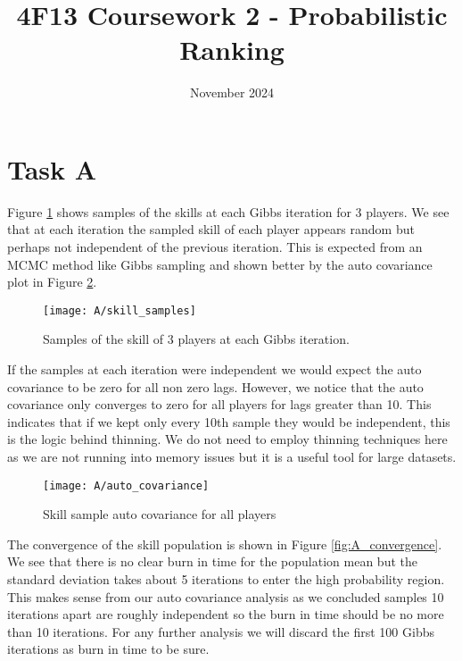 \documentclass[11pt]{article}
\title{\vspace{-2cm}4F13 Coursework 2 - Probabilistic Ranking}
\author{}
\date{November 2024}
\begin{document}


\setcounter{page}{1}

\maketitle

\section{Task A}

Figure \ref{fig:A_skill_samples} shows samples of the skills at each Gibbs iteration for 3 players. We see that at each iteration the sampled skill of each player appears random but perhaps not independent of the previous iteration. This is expected from an MCMC method like Gibbs sampling and shown better by the auto covariance plot in Figure \ref{fig:A_auto_covariance}. 

\begin{figure}[h]
    \centering
    \texttt{[image: A/skill\_samples]} 
    \caption{Samples of the skill of 3 players at each Gibbs iteration.}
    \label{fig:A_skill_samples}
\end{figure}

If the samples at each iteration were independent we would expect the auto covariance to be zero for all non zero lags. However, we notice that the auto covariance only converges to zero for all players for lags greater than 10. This indicates that if we kept only every 10th sample they would be independent, this is the logic behind thinning. We do not need to employ thinning techniques here as we are not running into memory issues but it is a useful tool for large datasets.

\begin{figure}[h]
    \centering
    \texttt{[image: A/auto\_covariance]} 
    \caption{Skill sample auto covariance for all players}
    \label{fig:A_auto_covariance}
\end{figure}

The convergence of the skill population is shown in Figure \ref{fig:A_convergence}. We see that there is no clear burn in time for the population mean but the standard deviation takes about 5 iterations to enter the high probability region. This makes sense from our auto covariance analysis as we concluded samples 10 iterations apart are roughly independent so the burn in time should be no more than 10 iterations. For any further analysis we will discard the first 100 Gibbs iterations as burn in time to be sure.
\end{document}
